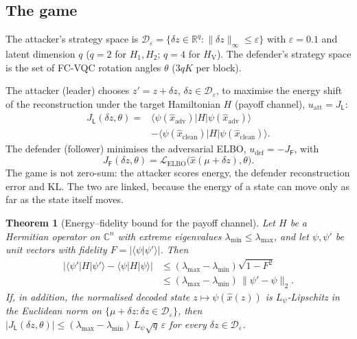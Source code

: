 \documentclass[conference]{IEEEtran}
\newtheorem{theorem}{Theorem}
\newcommand{\cL}{\mathcal{L}}
\newcommand{\HV}{H_{\mathrm{V}}}
\begin{document}
\subsection{The game}\label{sec:payoffB}
The attacker's strategy space is $\mathcal D_\varepsilon=\{\delta z\in\mathbb R^q:\|\delta z\|_\infty\le\varepsilon\}$ with $\varepsilon=0.1$ and latent dimension $q$ ($q{=}2$ for $H_1,H_2$; $q{=}4$ for $\HV$). The defender's strategy space is the set of FC-VQC rotation angles $\theta$ ($3qK$ per block).

The attacker (leader) chooses $z'=z+\delta z$, $\delta z\in\mathcal D_\varepsilon$, to maximise the energy shift of the reconstruction under the target Hamiltonian $H$ (payoff channel), $u_{\mathrm{att}}=J_{\mathsf L}$:
\begin{equation}
\begin{aligned}
J_{\mathsf L}(\delta z,\theta)={}&\langle\psi(\hat x_{\mathrm{adv}})|H|\psi(\hat x_{\mathrm{adv}})\rangle\\
&-\langle\psi(\hat x_{\mathrm{clean}})|H|\psi(\hat x_{\mathrm{clean}})\rangle.
\end{aligned}
\label{eq:JL}
\end{equation}
The defender (follower) minimises the adversarial ELBO, $u_{\mathrm{def}}=-J_{\mathsf F}$, with
\begin{equation}
J_{\mathsf F}(\delta z,\theta)=\cL_{\mathrm{ELBO}}\big(\hat x(\mu+\delta z),\theta\big).
\label{eq:JF}
\end{equation}
The game is not zero-sum: the attacker scores energy, the defender reconstruction error and KL. The two are linked, because the energy of a state can move only as far as the state itself moves.

\begin{theorem}[Energy--fidelity bound for the payoff channel]\label{thm:energy}
Let $H$ be a Hermitian operator on $\mathbb C^n$ with extreme eigenvalues $\lambda_{\min}\le\lambda_{\max}$, and let $\psi,\psi'$ be unit vectors with fidelity $F=|\langle\psi|\psi'\rangle|$. Then
\begin{equation}
\begin{aligned}
\big|\langle\psi'|H|\psi'\rangle-\langle\psi|H|\psi\rangle\big|&\le(\lambda_{\max}-\lambda_{\min})\sqrt{1-F^2}\\
&\le(\lambda_{\max}-\lambda_{\min})\,\|\psi'-\psi\|_2 .
\end{aligned}
\label{eq:energyfid}
\end{equation}
If, in addition, the normalised decoded state $z\mapsto\psi(\hat x(z))$ is $L_\psi$-Lipschitz in the Euclidean norm on $\{\mu+\delta z:\delta z\in\mathcal D_\varepsilon\}$, then $|J_{\mathsf L}(\delta z,\theta)|\le(\lambda_{\max}-\lambda_{\min})\,L_\psi\sqrt q\,\varepsilon$ for every $\delta z\in\mathcal D_\varepsilon$.
\end{theorem}
\end{document}

